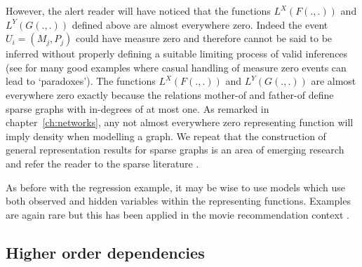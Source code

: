 However, the alert reader will have noticed that the functions $L^X(F(.,.))$ and $L^Y(G(.,.))$ defined above are almost everywhere zero.
Indeed the event $U_i = (M_j, P_j)$ could have measure zero and therefore cannot be said to be inferred without properly defining a suitable limiting process of valid inferences (see \eg \citet{Jaynes2003-jh} for many good examples where casual handling of measure zero events can lead to `paradoxes').
The functions $L^X(F(.,.))$ and $L^Y(G(.,.))$ are almost everywhere zero exactly because the relations mother-of and father-of define sparse graphs with in-degrees of at most one.
As remarked in chapter~\ref{ch:networks}, any not almost everywhere zero representing function will imply density when modelling a graph.
We repeat that the construction of general representation results for sparse graphs is an area of emerging research and refer the reader to the sparse literature \citep{Lovasz2012-df, Wolfe2013-vs, Caron2014-on}.

As before with the regression example, it may be wise to use models which use both observed and hidden variables within the representing functions.
Examples are again rare but this has been applied in \eg the movie recommendation context \citep[e.g.][]{Menon2011-ku}.

\subsection{Higher order dependencies}

